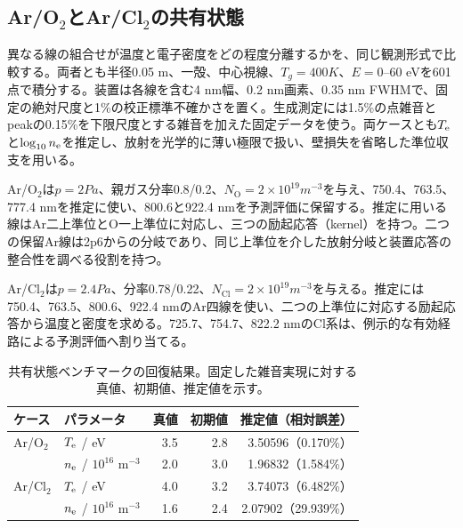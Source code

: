 \subsection{\texorpdfstring{Ar/O$_2$とAr/Cl$_2$}{Ar/O2とAr/Cl2}の共有状態}
異なる線の組合せが温度と電子密度をどの程度分離するかを、同じ観測形式で比較する。両者とも半径0.05 m、一殻、中心視線、$T_g=400\unit{K}$、$E=0$--60 eVを601点で積分する。装置は各線を含む4 nm幅、0.2 nm画素、0.35 nm FWHMで、固定の絶対尺度と1\%の校正標準不確かさを置く。生成測定には1.5\%の点雑音とpeakの0.15\%を下限尺度とする雑音を加えた固定データを使う。両ケースとも$T_{\mathrm e}$と$\log_{10}n_{\mathrm e}$を推定し、放射を光学的に薄い極限で扱い、壁損失を省略した準位収支を用いる。

Ar/O$_2$は$p=2\unit{Pa}$、親ガス分率0.8/0.2、$N_{\mathrm O}=2\times10^{19}\unit{m^{-3}}$を与え、750.4、763.5、777.4 nmを推定に使い、800.6と922.4 nmを予測評価に保留する。推定に用いる線はAr二上準位とO一上準位に対応し、三つの励起応答（kernel）を持つ。二つの保留Ar線は2p6からの分岐であり、同じ上準位を介した放射分岐と装置応答の整合性を調べる役割を持つ。

Ar/Cl$_2$は$p=2.4\unit{Pa}$、分率0.78/0.22、$N_{\mathrm{Cl}}=2\times10^{19}\unit{m^{-3}}$を与える。推定には750.4、763.5、800.6、922.4 nmのAr四線を使い、二つの上準位に対応する励起応答から温度と密度を求める。725.7、754.7、822.2 nmのCl系は、例示的な有効経路による予測評価へ割り当てる。

\begin{table}[htbp]
\centering\small
\begin{tabular}{llrrr}
\toprule
ケース & パラメータ & 真値 & 初期値 & 推定値（相対誤差） \\
\midrule
Ar/O$_2$ & $T_{\mathrm e}$ / eV & 3.5 & 2.8 & 3.50596（0.170\%） \\
 & $n_{\mathrm e}$ / $10^{16}$ m$^{-3}$ & 2.0 & 3.0 & 1.96832（1.584\%） \\
Ar/Cl$_2$ & $T_{\mathrm e}$ / eV & 4.0 & 3.2 & 3.74073（6.482\%） \\
 & $n_{\mathrm e}$ / $10^{16}$ m$^{-3}$ & 1.6 & 2.4 & 2.07902（29.939\%） \\
\bottomrule
\end{tabular}
\caption{共有状態ベンチマークの回復結果。固定した雑音実現に対する真値、初期値、推定値を示す。}
\label{tab:commonrecovery}
\end{table}


